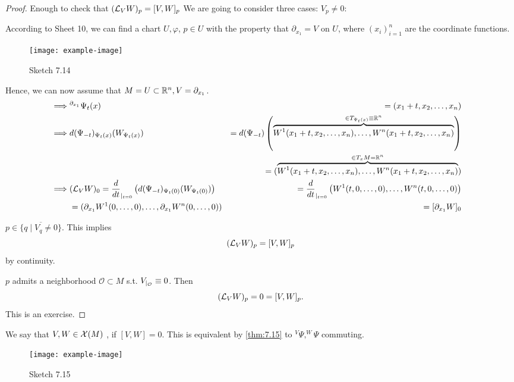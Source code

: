 \begin{proof}
    Enough to check that \((\mathcal{L}_VW)_p=[V,W]_p\)
    We are going to consider three cases:
     \(V_p\neq 0\):

     According to Sheet 10, we can find a chart \(U,\varphi\), \(p\in U\) with the property 
    that \(\partial_{x_1}=V\) on \(U\), where \((x_i)_{i=1}^n\) are the coordinate functions.
    \begin{figure}[H]\label{fig:7.14}
        \centering
        \texttt{[image: example-image]}
        \caption{Sketch 7.14}
    \end{figure}
    Hence, we can now assume that \(M=U\subset\mathbb{R}^n,V=\partial_{x_1}\).  %
    \begin{align*}
        \implies& {}^{\partial_{x_1}}\Psi_t(x)&=(x_1+t,x_2,\dots,x_n)\\
        \implies& d(\Psi_{-t})_{\Psi_t(x)}(W_{\Psi_t(x)})&=d(\Psi_{-t})\left(\overbrace{W^1(x_1+t,x_2,\dots,x_n),\dots,W^n(x_1+t,x_2,\dots,x_n)}^{\in T_{\Psi_t(x)}\equiv \mathbb{R}^n}\right)&\\
        &&=(\overbrace{W^1(x_1+t,x_2,\dots,x_n),\dots,W^n(x_1+t,x_2,\dots,x_n)}^{\in T_x M=\mathbb{R}^n})&\\
        \implies& (\mathcal{L}_V W)_0 =\frac{d}{dt}_{|_{t=0}}\left(d(\Psi_{-t})_{\Psi_t(0)}(W_{\Psi_t(0)})\right)&=\frac{d}{dt}_{|_{t=0}}\left(W^1(t,0,\dots,0),\dots,W^n(t,0,\dots,0)\right)&\\
        &= (\partial_{x_1}W^{1}(0,\dots,0),\dots,\partial_{x_1}W^{n}(0,\dots,0))&=[\partial_{x_1}W]_0&
    \end{align*}
    
     \(p\in \overline{\{q\mid V_q\neq 0\}}\). This implies 
    \[(\mathcal{L}_VW)_p=[V,W]_p\]
    by continuity.

     \(p\) admits a neighborhood \(\mathcal{O}\subset M\) s.t. \(V_{|_{\mathcal{O}}}\equiv 0\). Then 
    \[(\mathcal{L}_VW)_p=0=[V,W]_p.\]
    This is an exercise.
\end{proof}

 We say that \(V,W\in\mathcal{X}(M)\) , if \([V,W]=0\).
This is equivalent by \ref{thm:7.15} to \(^V\Psi,^W \Psi\) commuting.

\begin{figure}[H]\label{fig:7.15}
    \centering
    \texttt{[image: example-image]}
    \caption{Sketch 7.15}
\end{figure}

